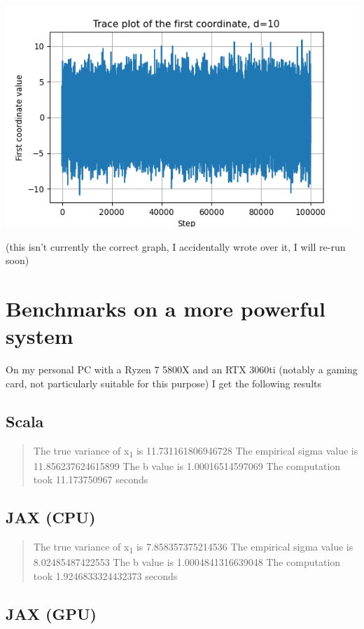 \documentclass[letterpaper]{article}
\begin{document}
\begin{center}
\includegraphics[width=.9\linewidth]{./Figures/adaptive_trace_jax_high_d.png}
\end{center}

(this isn't currently the correct graph, I accidentally wrote over it, I will re-run soon)
\section{Benchmarks on a more powerful system}
\label{sec:orgedf63c5}

On my personal PC with a Ryzen 7 5800X and an RTX 3060ti (notably a gaming card, not particularly suitable for this purpose) I get the following results
\subsection{Scala}
\label{sec:orge14b8e0}

\begin{quote}
The true variance of x\textsubscript{1} is 11.731161806946728
The empirical sigma value is 11.856237624615899
The b value is 1.00016514597069
The computation took 11.173750967 seconds
\end{quote}
\subsection{JAX (CPU)}
\label{sec:org770b721}

\begin{quote}
The true variance of x\textsubscript{1} is 7.858357375214536
The empirical sigma value is 8.02485487422553
The b value is 1.0004841316639048
The computation took 1.9246833324432373 seconds
\end{quote}
\subsection{JAX (GPU)}
\label{sec:orgf6d4c8e}
\end{document}

